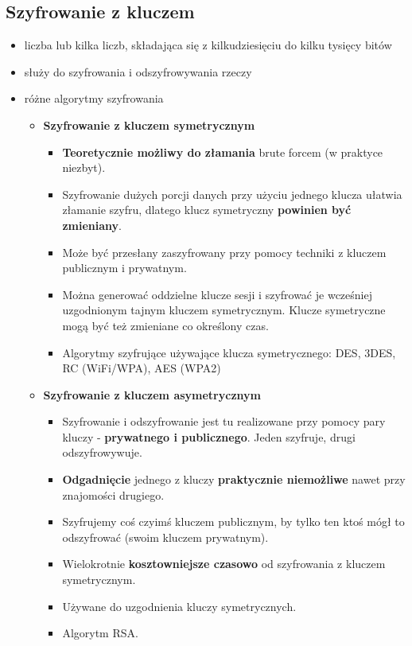 \documentclass[../main.tex]{subfiles}
\begin{document}
    \subsection{Szyfrowanie z kluczem}
    \begin{itemize}
        \item liczba lub kilka liczb, składająca się z kilkudziesięciu do kilku tysięcy bitów
        \item służy do szyfrowania i odszyfrowywania rzeczy
        \item różne algorytmy szyfrowania
        \begin{itemize}
            \item \textbf{Szyfrowanie z kluczem symetrycznym}\\
            \begin{itemize}
                \item \textbf{Teoretycznie możliwy do złamania} brute forcem (w praktyce niezbyt).
                \item Szyfrowanie dużych porcji danych przy użyciu jednego klucza ułatwia złamanie
                szyfru, dlatego klucz symetryczny \textbf{powinien być zmieniany}.
                \item Może być przesłany zaszyfrowany przy pomocy techniki z kluczem
                publicznym i prywatnym.
                \item Można generować oddzielne klucze sesji i szyfrować je
                wcześniej uzgodnionym tajnym kluczem symetrycznym. Klucze symetryczne mogą być też
                zmieniane co określony czas.
                \item Algorytmy szyfrujące używające klucza symetrycznego: DES, 3DES, RC (WiFi/WPA), AES (WPA2)
            \end{itemize}
            \item \textbf{Szyfrowanie z kluczem asymetrycznym}
            \begin{itemize}
                \item Szyfrowanie i odszyfrowanie jest tu realizowane przy pomocy pary kluczy - \textbf{prywatnego
                i publicznego}. Jeden szyfruje, drugi odszyfrowywuje.
                \item \textbf{Odgadnięcie} jednego z kluczy \textbf{praktycznie niemożliwe} nawet przy znajomości drugiego.
                \item Szyfrujemy coś czyimś kluczem publicznym, by tylko ten ktoś mógł to odszyfrować (swoim kluczem prywatnym).
                \item Wielokrotnie \textbf{kosztowniejsze czasowo} od szyfrowania z kluczem symetrycznym.
                \item Używane do uzgodnienia kluczy symetrycznych.
                \item Algorytm RSA.
            \end{itemize}
        \end{itemize}

    \end{itemize}
\end{document}
